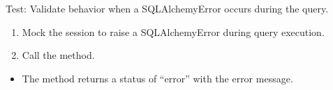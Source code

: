 \documentclass[letterpaper,10pt,english]{sphinxmanual}
\begin{document}
\begin{fulllineitems}
\label{\detokenize{test:test.test_family.test_list_families_sqlalchemy_error}}
\pysigstartsignatures
\pysiglinewithargsret
{}
{\sphinxparamcomma {}}
{}
\pysigstopsignatures
\sphinxAtStartPar
Test: Validate behavior when a SQLAlchemyError occurs during the query.
\begin{description}
\begin{enumerate}
%
\item {} 
\sphinxAtStartPar
Mock the session to raise a SQLAlchemyError during query execution.

\item {} 
\sphinxAtStartPar
Call the  method.

\end{enumerate}

\begin{itemize}
\item {} 
\sphinxAtStartPar
The method returns a status of “error” with the error message.

\end{itemize}

\end{description}

\end{fulllineitems}

\end{document}
